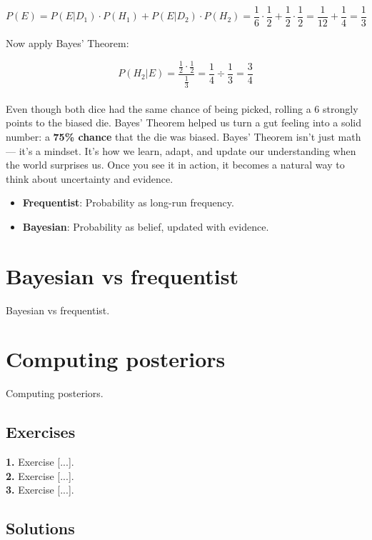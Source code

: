 \documentclass{book}
\begin{document}
\[
P(E) = P(E | D_1) \cdot P(H_1) + P(E | D_2) \cdot P(H_2) = \frac{1}{6} \cdot \frac{1}{2} + \frac{1}{2} \cdot \frac{1}{2}
= \frac{1}{12} + \frac{1}{4} = \frac{1}{3}
\]

Now apply Bayes' Theorem:

\[
P(H_2 | E) = \frac{\frac{1}{2} \cdot \frac{1}{2}}{\frac{1}{3}} = \frac{1}{4} \div \frac{1}{3} = \frac{3}{4}
\]\\

Even though both dice had the same chance of being picked, rolling a 6 strongly points to the biased die. Bayes’ Theorem helped us turn a gut feeling into a solid number: a \textbf{75\% chance} that the die was biased. Bayes’ Theorem isn’t just math — it’s a mindset. It’s how we learn, adapt, and update our understanding when the world surprises us. Once you see it in action, it becomes a natural way to think about uncertainty and evidence.

\begin{itemize}
    \item \textbf{Frequentist}: Probability as long-run frequency.
    \item \textbf{Bayesian}: Probability as belief, updated with evidence.
\end{itemize}

\newpage

\section{Bayesian vs frequentist}
Bayesian vs frequentist.

\newpage

\section{Computing posteriors}
Computing posteriors.

\subsection*{Exercises}

\textbf{1.} Exercise [...].\\

\textbf{2.} Exercise [...].\\

\textbf{3.} Exercise [...].\\

\newpage

\subsection*{Solutions}
\end{document}
